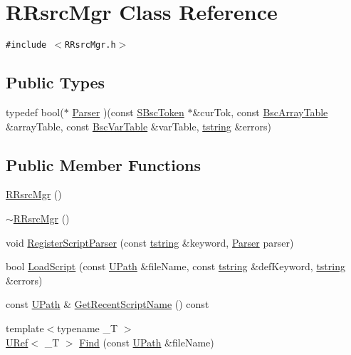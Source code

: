 \hypertarget{class_r_rsrc_mgr}{
\section{RRsrcMgr Class Reference}
\label{class_r_rsrc_mgr}
}
{\tt \#include $<$RRsrcMgr.h$>$}

\subsection*{Public Types}
\begin{CompactItemize}
\item 
typedef bool($\ast$ \hyperlink{class_r_rsrc_mgr_359896706d65e8e2e2ced96dc0d49e56}{Parser} )(const \hyperlink{struct_s_bsc_token}{SBscToken} $\ast$\&curTok, const \hyperlink{class_bsc_array_table}{BscArrayTable} \&arrayTable, const \hyperlink{class_bsc_var_table}{BscVarTable} \&varTable, \hyperlink{common__afx_8h_816fa58fd77499b0edb2c69ebe803d5c}{tstring} \&errors)
\end{CompactItemize}
\subsection*{Public Member Functions}
\begin{CompactItemize}
\item 
\hyperlink{class_r_rsrc_mgr_acd157e562874bb99560a186389a7462}{RRsrcMgr} ()
\item 
\hyperlink{class_r_rsrc_mgr_2c82af2b8c9a9aebd2ac10867e37df60}{$\sim$RRsrcMgr} ()
\item 
void \hyperlink{class_r_rsrc_mgr_6f9573818e19ea3c0510e7e29750968a}{RegisterScriptParser} (const \hyperlink{common__afx_8h_816fa58fd77499b0edb2c69ebe803d5c}{tstring} \&keyword, \hyperlink{class_r_rsrc_mgr_359896706d65e8e2e2ced96dc0d49e56}{Parser} parser)
\item 
bool \hyperlink{class_r_rsrc_mgr_bb72c237e1e5983a8e9b440849f4b66f}{LoadScript} (const \hyperlink{class_u_path}{UPath} \&fileName, const \hyperlink{common__afx_8h_816fa58fd77499b0edb2c69ebe803d5c}{tstring} \&defKeyword, \hyperlink{common__afx_8h_816fa58fd77499b0edb2c69ebe803d5c}{tstring} \&errors)
\item 
const \hyperlink{class_u_path}{UPath} \& \hyperlink{class_r_rsrc_mgr_a85d4b83e5e1fdbd0ced9f1299e93cdc}{GetRecentScriptName} () const 
\item 
{\footnotesize template$<$typename \_\-T $>$ }\\\hyperlink{class_u_ref}{URef}$<$ \_\-T $>$ \hyperlink{class_r_rsrc_mgr_90e9653a560fc78a64f5799a420c155f}{Find} (const \hyperlink{class_u_path}{UPath} \&fileName)
\end{CompactItemize}


